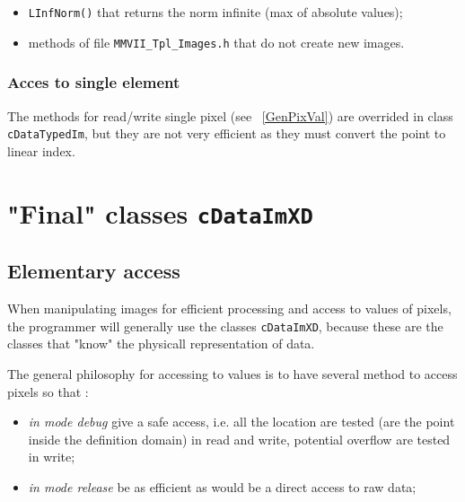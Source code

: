 \begin{itemize}
    \item {\tt LInfNorm()}  that returns the norm infinite (max of absolute values);

    \item  methods of file  {\tt MMVII\_Tpl\_Images.h} that do not create new images.
\end{itemize}


\subsubsection{Acces to single element}

The methods for read/write single pixel (see ~\ref{GenPixVal}) are
overrided in class {\tt cDataTypedIm}, but they are  not very efficient
as they must convert the point to linear index.


\section{"Final" classes {\tt cDataImXD}}

\subsection{Elementary access}

When manipulating images for efficient processing and access to values of pixels, the programmer
will generally use the classes  {\tt cDataImXD}, because these are the classes
that "know" the physicall representation of data. 

The general philosophy for accessing to values is  to have several method to access pixels so that :

\begin{itemize}
    \item  \emph{in mode debug} give a safe access, i.e. all the location are tested (are the point inside
           the definition domain) in read and write, potential overflow are tested in write;

    \item  \emph{in mode release} be as efficient as would be a direct access to raw data;

\end{itemize}

